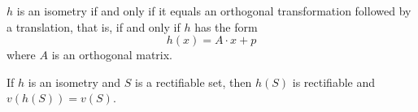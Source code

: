 \begin{theorem}
    $h$ is an isometry if and only if it equals an orthogonal transformation followed by a translation, that is, if and only if $h$ has the form $$h(x)=A\cdot x+p$$
    where $A$ is an orthogonal matrix.
\end{theorem}

\begin{theorem}
    If $h$ is an isometry and $S$ is a rectifiable set, then $h(S)$ is rectifiable and $v(h(S))=v(S)$.
\end{theorem}